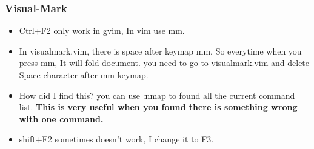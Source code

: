 \documentclass[paper=8.5in:11in, twoside, 12pt, pagesize=pdftex]{book}
\begin{document}
									\subsubsection{Visual-Mark}
									\begin{itemize}
										\item Ctrl+F2 only work in gvim, In vim use mm.
										
										\item In visualmark.vim, there is space after keymap mm, So everytime when you press mm, It will fold document. you need to go to visualmark.vim and delete Space character after mm keymap.
										
										\item How did I find this? you can use :nmap to found all the current command list. \textbf{This is very useful when you found there is something wrong with one command.}
										
										\item shift+F2 sometimes doesn't work, I change it to F3. 
										
									\end{itemize}
									
\end{document}
